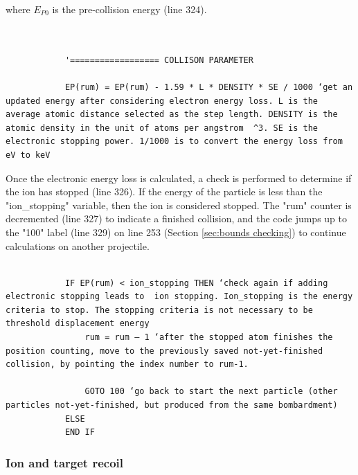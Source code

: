 \documentclass[10pt, reqno]{exam}
\begin{document}
where $E_{P0}$ is the pre-collision energy (line 324). \par

\begin{verbatim}   

    
            '================== COLLISON PARAMETER
    
            EP(rum) = EP(rum) - 1.59 * L * DENSITY * SE / 1000 ‘get an updated energy after considering electron energy loss. L is the average atomic distance selected as the step length. DENSITY is the atomic density in the unit of atoms per angstrom  ^3. SE is the electronic stopping power. 1/1000 is to convert the energy loss from eV to keV
\end{verbatim}

Once the electronic energy loss is calculated, a check is performed to determine if the ion has stopped (line 326). If the energy of the particle is less than the "ion\_stopping" variable, then the ion is considered stopped. The "rum" counter is decremented (line 327) to indicate a finished collision, and the code jumps up to the "100" label (line 329) on line 253  (Section \ref{sec:bounds checking}) to continue calculations on another projectile. \par

\begin{verbatim}   

            IF EP(rum) < ion_stopping THEN ‘check again if adding electronic stopping leads to  ion stopping. Ion_stopping is the energy criteria to stop. The stopping criteria is not necessary to be threshold displacement energy
                rum = rum – 1 ‘after the stopped atom finishes the position counting, move to the previously saved not-yet-finished collision, by pointing the index number to rum-1. 
    
                GOTO 100 ‘go back to start the next particle (other particles not-yet-finished, but produced from the same bombardment)
            ELSE
            END IF
\end{verbatim}

\clearpage

\subsubsection{Ion and target recoil}
\end{document}
